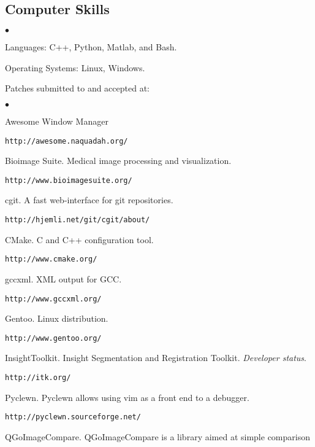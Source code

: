 \documentclass[margin,line]{res}
\newenvironment{list2}{
  \begin{list}{$\bullet$}{%
      \setlength{\itemsep}{0in}
      \setlength{\parsep}{0in} \setlength{\parskip}{0in}
      \setlength{\topsep}{0in} \setlength{\partopsep}{0in} 
      \setlength{\leftmargin}{0.2in}}}{\end{list}}
\begin{document}
\begin{resume}
%
\section{\sc Computer Skills} 
\begin{list2}
\item Languages:  C++, Python, Matlab, and Bash.
\item Operating Systems:  Linux, Windows.\\ 
\end{list2}
\vspace*{-.15in}

Patches submitted to and accepted at:
\begin{list2}
\item Awesome Window Manager
  \begin{verbatim}http://awesome.naquadah.org/\end{verbatim}
\item Bioimage Suite.  Medical image processing and visualization.
  \begin{verbatim}http://www.bioimagesuite.org/\end{verbatim}
\item cgit. A fast web-interface for git repositories. \begin{verbatim}http://hjemli.net/git/cgit/about/\end{verbatim}
\item CMake.  C and C++ configuration tool.
  \begin{verbatim}http://www.cmake.org/\end{verbatim}
\item gccxml.  XML output for GCC.
  \begin{verbatim}http://www.gccxml.org/\end{verbatim}
\item Gentoo.  Linux distribution.
  \begin{verbatim}http://www.gentoo.org/\end{verbatim}
\item InsightToolkit.  Insight Segmentation and Registration Toolkit.  \textit{Developer status}.
  \begin{verbatim}http://itk.org/\end{verbatim}
\item Pyclewn.  Pyclewn allows using vim as a front end to a debugger.
  \begin{verbatim}http://pyclewn.sourceforge.net/\end{verbatim}
\item QGoImageCompare.  QGoImageCompare is a library aimed at simple comparison

\end{list2}
\end{resume}
\end{document}
